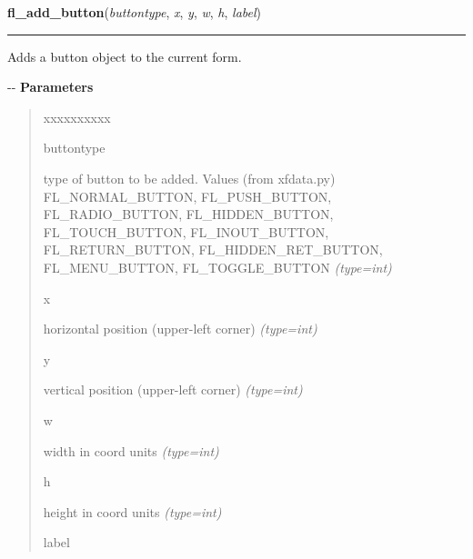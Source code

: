     \label{xformslib:flbutton:fl_add_button}

    \vspace{0.5ex}

\hspace{.8\funcindent}\begin{boxedminipage}{\funcwidth}

    \raggedright \textbf{fl\_add\_button}(\textit{buttontype}, \textit{x}, \textit{y}, \textit{w}, \textit{h}, \textit{label})

    \vspace{-1.5ex}

    \rule{\textwidth}{0.5\fboxrule}
\setlength{\parskip}{2ex}

Adds a button object to the current form.

-{}-
\setlength{\parskip}{1ex}
      \textbf{Parameters}
      \vspace{-1ex}

      \begin{quote}
        \begin{Ventry}{xxxxxxxxxx}

          \item[buttontype]


type of button to be added. Values (from xfdata.py) FL\_NORMAL\_BUTTON,
FL\_PUSH\_BUTTON, FL\_RADIO\_BUTTON, FL\_HIDDEN\_BUTTON, FL\_TOUCH\_BUTTON,
FL\_INOUT\_BUTTON, FL\_RETURN\_BUTTON, FL\_HIDDEN\_RET\_BUTTON,
FL\_MENU\_BUTTON, FL\_TOGGLE\_BUTTON
            {\it (type=int)}

          \item[x]


horizontal position (upper-left corner)
            {\it (type=int)}

          \item[y]


vertical position (upper-left corner)
            {\it (type=int)}

          \item[w]


width in coord units
            {\it (type=int)}

          \item[h]


height in coord units
            {\it (type=int)}

          \item[label]



\end{Ventry}
\end{quote}
\end{boxedminipage}
